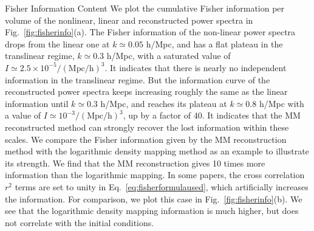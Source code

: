 \begin{section}{Fisher Information Content}
  We plot the cumulative Fisher information per volume of the
  nonlinear, linear and reconstructed power spectra in
  Fig.~\ref{fig:fisherinfo}(a). The Fisher information of the
  non-linear power spectra drops from the linear one at
  $k \simeq 0.05$ h/Mpc, and has a flat plateau in the translinear
  regime, $k\simeq 0.3$ h/Mpc, with a saturated value of
  $I \simeq 2.5 \times 10^{-5}/\mathrm{(Mpc/h)}^3$.  It indicates
  that there is nearly no independent information in the translinear
  regime.  But the information curve of the reconstructed power
  spectra keeps increasing roughly the same as the linear information
  until $k\simeq 0.3$ h/Mpc, and reaches its plateau at $k\simeq 0.8$
  h/Mpc with a value of $I \simeq 10^{-3}/\mathrm{(Mpc/h)}^3$, up by
  a factor of 40.  It indicates that the MM reconstructed method can
  strongly recover the lost information within these scales.  We
  compare the Fisher information given by the MM reconstruction method
  with the logarithmic density mapping method \cite{bib:Mark2009} as
  an example to illustrate its strength.  We find that the MM
  reconstruction gives 10 times more information than the logarithmic
  mapping.  In some papers, the cross correlation $r^2$ terms are set
  to unity in Eq.~\ref{eq:fisherformulaused}, which artificially
  increases the information.  For comparison, we plot this
  case in Fig.~\ref{fig:fisherinfo}(b).  We see that the logarithmic
  density mapping information is much higher, but does not correlate
  with the initial conditions.


\end{section}
